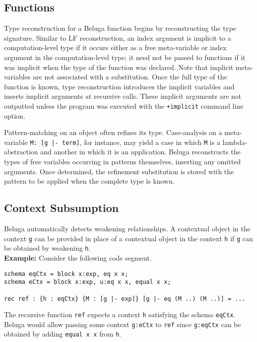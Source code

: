 \documentclass[11pt]{article}
\begin{document}
\subsection{Functions}
Type reconstruction for a Beluga function begins by reconstructing the type signature. Similar to LF reconstruction, an index argument is implicit to a computation-level type if it occurs either as a free meta-variable or index argument in the computation-level type; it need not be passed to functions if it was implicit when the type of the function was declared. Note that implicit meta-variables are not associated with a substitution. Once the full type of the function is known, type reconstruction introduces the implicit variables and inserts implicit arguments at recursive calls. These implicit arguments are not outputted unless the program was executed with the \texttt{+implicit} command line option.
 
Pattern-matching on an object often refines its type. Case-analysis on a meta-variable \texttt{M: [g |- term]}, for instance, may yield a case in which \texttt{M} is a lambda-abstraction and another in which it is an application. Beluga reconstructs the types of free variables occurring in patterns themselves, inserting any omitted arguments. Once determined, the refinement substitution is stored with the pattern to be applied when the complete type is known.

\subsection{Context Subsumption}
Beluga automatically detects weakening relationships. A contextual object in the context \texttt{g} can be provided in place of a contextual object in the context \texttt{h} if \texttt{g} can be obtained by weakening \texttt{h}. \\

\textbf{Example:} Consider the following code segment.
\begin{verbatim}
schema eqCtx = block x:exp, eq x x;
schema eCtx = block x:exp, u:eq x x, equal x x;

rec ref : {h : eqCtx} {M : [g |- exp]} [g |- eq (M ..) (M ..)] = ...
\end{verbatim}
The recursive function \texttt{ref} expects a context \texttt{h} satisfying the schema \texttt{eqCtx}. Beluga would allow passing some context \texttt{g:eCtx} to \texttt{ref} since \texttt{g:eqCtx} can be obtained by adding \texttt{equal x x} from \texttt{h}.
\end{document}
